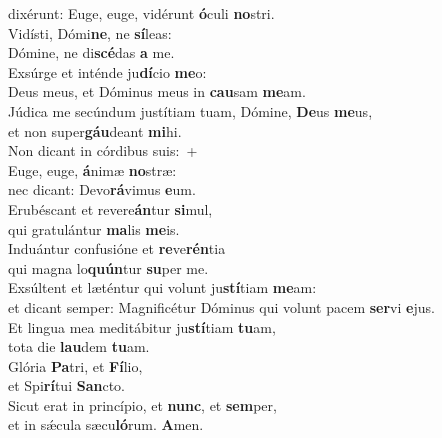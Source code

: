 \evenverse dixérunt: Euge, euge, vidérunt \textbf{ó}culi \textbf{no}stri.\\
\oddverse Vidísti, Dómi\textbf{ne}, ne \textbf{sí}leas:~\*\\
\oddverse Dómine, ne di\textbf{scé}das \textbf{a} me.\\
\evenverse Exsúrge et inténde ju\textbf{dí}cio \textbf{me}o:~\*\\
\evenverse Deus meus, et Dóminus meus in \textbf{cau}sam \textbf{me}am.\\
\oddverse Júdica me secúndum justítiam tuam, Dómine, \textbf{De}us \textbf{me}us,~\*\\
\oddverse et non super\textbf{gáu}deant \textbf{mi}hi.\\
\evenverse Non dicant in córdibus suis:~+\\
\evenverse  Euge, euge, \textbf{á}nimæ \textbf{no}stræ:~\*\\
\evenverse nec dicant: Devo\textbf{rá}vimus \textbf{e}um.\\
\oddverse Erubéscant et revere\textbf{án}tur \textbf{si}mul,~\*\\
\oddverse qui gratulántur \textbf{ma}lis \textbf{me}is.\\
\evenverse Induántur confusióne et \textbf{re}ve\textbf{rén}tia~\*\\
\evenverse qui magna lo\textbf{quún}tur \textbf{su}per me.\\
\oddverse Exsúltent et læténtur qui volunt ju\textbf{stí}tiam \textbf{me}am:~\*\\
\oddverse et dicant semper: Magnificétur Dóminus qui volunt pacem \textbf{ser}vi \textbf{e}jus.\\
\evenverse Et lingua mea meditábitur ju\textbf{stí}tiam \textbf{tu}am,~\*\\
\evenverse tota die \textbf{lau}dem \textbf{tu}am.\\
\oddverse Glória \textbf{Pa}tri, et \textbf{Fí}lio,~\*\\
\oddverse et Spi\textbf{rí}tui \textbf{San}cto.\\
\evenverse Sicut erat in princípio, et \textbf{nunc}, et \textbf{sem}per,~\*\\
\evenverse et in sǽcula sæcu\textbf{ló}rum. \textbf{A}men.\\
